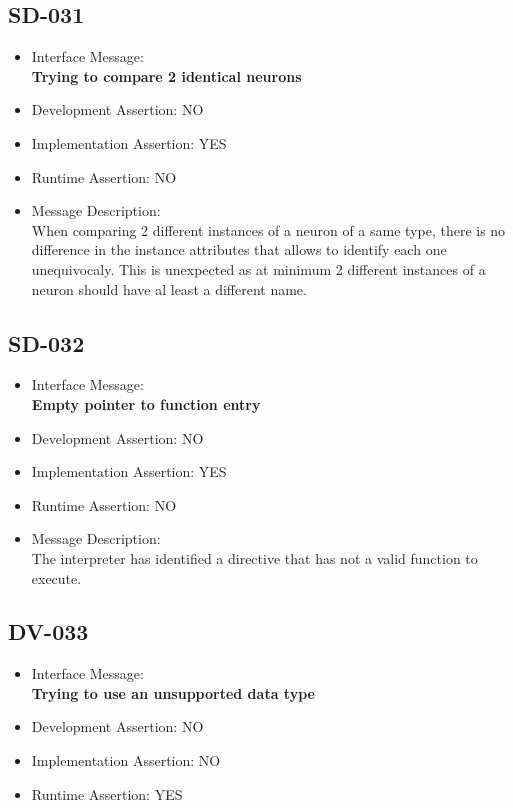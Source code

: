 \subsection{SD-031}
\begin{itemize}
  \item Interface Message:\\[1em]
    \textbf{Trying to compare 2 identical neurons}
  \item Development Assertion: NO
  \item Implementation Assertion: YES
  \item Runtime Assertion: NO
  \item Message Description:\\[1em]
    When comparing 2 different instances of a neuron of a same type, there is no difference in the instance attributes that allows to identify each one unequivocaly. This is unexpected as at minimum 2 different instances of a neuron should have al least a different name.
\end{itemize}

\subsection{SD-032}
\begin{itemize}
  \item Interface Message:\\[1em]
    \textbf{Empty pointer to function entry}
  \item Development Assertion: NO
  \item Implementation Assertion: YES
  \item Runtime Assertion: NO
  \item Message Description:\\[1em]
    The interpreter has identified a directive that has not a valid function to execute.
\end{itemize}

\subsection{DV-033}
\begin{itemize}
  \item Interface Message:\\[1em]
    \textbf{Trying to use an unsupported data type}
  \item Development Assertion: NO
  \item Implementation Assertion: NO
  \item Runtime Assertion: YES
\end{itemize}

